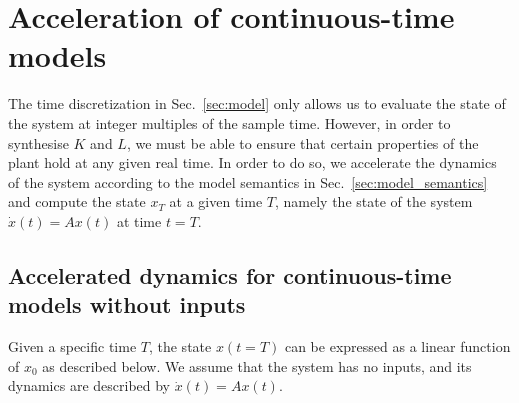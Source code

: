 \documentclass[sigconf]{llncs}
\newcommand{\mat}[1]{{#1}}
\renewcommand{\vec}[1]{{#1}}
\begin{document}
 \section{Acceleration of continuous-time models}\label{sec:continuous_time_accel}
 The time discretization in Sec.~\ref{sec:model} only 
 allows us to evaluate the state of the system at integer multiples of the sample time.
 However, in order to synthesise $\mat{K}$ and $\mat{L}$, 
 we must be able to ensure that certain properties of the plant hold at any given real time. 
 In order to do so, 
 we accelerate the dynamics of the system according to the model semantics in Sec.~\ref{sec:model_semantics} and compute the state $\vec{x}_T$  at a given time $T$, 
namely the state of the system $\dot{\vec{x}}(t)=\mat{A}\vec{x}(t)$ at time $t=T$.
 
 \subsection{Accelerated dynamics for continuous-time models without inputs}\label{sec:cont_acc_no_inputs}
 
 Given a specific time $T$, the state $\vec{x}(t=T)$ can be expressed as a linear function of $\vec{x}_0$ as described below.
We assume that the system has no inputs, and its dynamics are described by $\dot{\vec{x}}(t)=\mat{A}\vec{x}(t)$.
 
\end{document}

